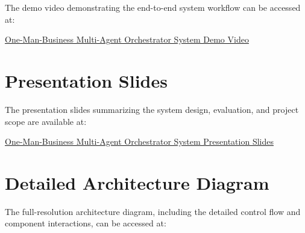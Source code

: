 \documentclass[11pt]{article}
\begin{document}
The demo video demonstrating the end-to-end system workflow can be accessed at:

\href{https://youtu.be/AAmxgg40FW0?si=SxDm1C5yMYnv5M_1}{One-Man-Business Multi-Agent Orchestrator System Demo Video}

\section{Presentation Slides}
\label{app:slides}

The presentation slides summarizing the system design, evaluation, and project scope are available at:

\href{https://docs.google.com/presentation/d/151UmyMhb4_M2kS_1uxL8sJY5ovF1HBeqFqsfzxMgCDA/edit?usp=sharing}{One-Man-Business Multi-Agent Orchestrator System Presentation Slides}

\section{Detailed Architecture Diagram}
\label{appendix:architecture}

The full-resolution architecture diagram, including the detailed control flow and component interactions, can be accessed at:
\end{document}
